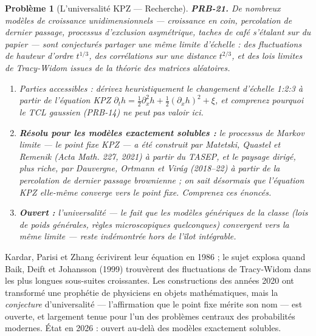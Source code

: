 \documentclass[11pt]{article}
\newtheorem{problem}{Problème}
\begin{document}
\bigskip

\begin{problem}[{L'universalité KPZ --- Recherche}]
\textbf{PRB-21.} De nombreux modèles de croissance unidimensionnels ---
croissance en coin, percolation de dernier passage, processus d'exclusion asymétrique, taches de
café s'étalant sur du papier --- sont conjecturés partager une même limite d'échelle : des
fluctuations de hauteur d'ordre $ t^{1/3} $, des corrélations sur une distance $ t^{2/3} $, et
des lois limites de Tracy-Widom issues de la théorie des matrices aléatoires.
\begin{enumerate}
\item[(i)] Parties accessibles : dérivez heuristiquement le changement d'échelle 1:2:3 à partir de
l'équation KPZ $ \partial_t h = \tfrac12 \partial_x^2 h + \tfrac12 (\partial_x h)^2 +
\xi $, et comprenez pourquoi le TCL gaussien (PRB-14) \textit{ne peut pas} valoir ici.
\item[(ii)] \textbf{Résolu pour les modèles exactement solubles :} le processus de Markov limite --- le point
fixe KPZ --- a été construit par Matetski, Quastel et Remenik (Acta Math. 227, 2021) à partir du
TASEP, et le paysage dirigé, plus riche, par Dauvergne, Ortmann et Virág (2018--22) à partir de la
percolation de dernier passage brownienne ; on sait désormais que l'équation KPZ elle-même converge
vers le point fixe. Comprenez ces énoncés.
\item[(iii)] \textbf{Ouvert :} l'universalité --- le fait que les modèles génériques de la classe (lois de poids
générales, règles microscopiques quelconques) convergent vers la même limite --- reste indémontrée
hors de l'îlot intégrable.
\end{enumerate}

\end{problem}

\noindent Kardar, Parisi et Zhang écrivirent leur équation en 1986 ; le sujet explosa
quand Baik, Deift et Johansson (1999) trouvèrent des fluctuations de Tracy-Widom dans les plus
longues sous-suites croissantes. Les constructions des années 2020 ont transformé une prophétie de
physiciens en objets mathématiques, mais la \textit{conjecture} d'universalité --- l'affirmation que le
point fixe mérite son nom --- est ouverte, et largement tenue pour l'un des problèmes centraux des
probabilités modernes. État en 2026 : ouvert au-delà des modèles exactement solubles.
\end{document}
